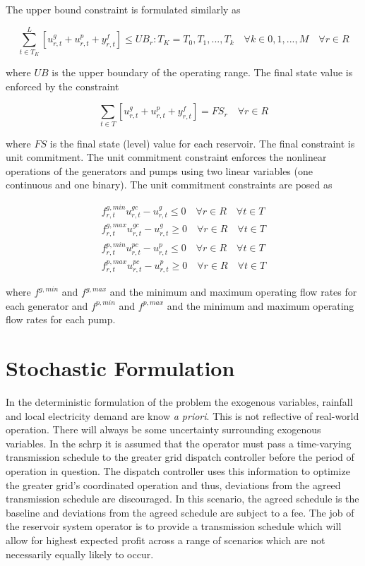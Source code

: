 \documentclass[12pt]{article}
\begin{document}
The upper bound constraint is formulated similarly as

\begin{equation}
	\sum_{t\in T_K}^{L}[u_{r,t}^{g}+u_{r,t}^{p}+y_{r,t}^{f}]\leq UB_{r} : T_K=T_0,T_1,...,T_k \quad\forall k \in 0,1,...,M \quad\forall r \in R \label{eq:ub}
\end{equation}

where $UB$ is the upper boundary of the operating range. The final state value is enforced by the constraint

\begin{equation}
	\sum_{t\in T}[u_{r,t}^{g}+u_{r,t}^{p}+y_{r,t}^{f}]=FS_{r} \quad\forall r \in R \label{eq:fs}
\end{equation}

where $FS$ is the final state (level) value for each reservoir. The final constraint is unit commitment. The unit commitment constraint enforces the nonlinear operations of the generators and pumps using two linear variables (one continuous and one binary). The unit commitment constraints are posed as

\begin{gather}
	f_{r,t}^{g,min}u_{r,t}^{gc}-u_{r,t}^{g}\leq 0 \quad\forall r \in R \quad\forall t \in T\\
	f_{r,t}^{g,max}u_{r,t}^{gc}-u_{r,t}^{g}\geq 0 \quad\forall r \in R \quad\forall t \in T\\
	f_{r,t}^{p,min}u_{r,t}^{pc}-u_{r,t}^{p}\leq 0 \quad\forall r \in R \quad\forall t \in T\\
	f_{r,t}^{p,max}u_{r,t}^{pc}-u_{r,t}^{p}\geq 0 \quad\forall r \in R \quad\forall t \in T
\end{gather}

where $f^{g,min}$ and $f^{g,max}$ and the minimum and maximum operating flow rates for each generator and $f^{p,min}$ and $f^{p,max}$ and the minimum and maximum operating flow rates for each pump.

\section*{Stochastic Formulation}

In the deterministic formulation of the problem the exogenous variables, rainfall and local electricity demand are know \textit{a priori}. This is not reflective of real-world operation. There will always be some uncertainty surrounding exogenous variables. In the \gls{schrp} it is assumed that the operator must pass a time-varying transmission schedule to the greater grid dispatch controller before the period of operation in question. The dispatch controller uses this information to optimize the greater grid's coordinated operation and thus, deviations from the agreed transmission schedule are discouraged. In this scenario, the agreed schedule is the baseline and deviations from the agreed schedule are subject to a fee. The job of the reservoir system operator is to provide a transmission schedule which will allow for highest expected profit across a range of scenarios which are not necessarily equally likely to occur.
\end{document}

